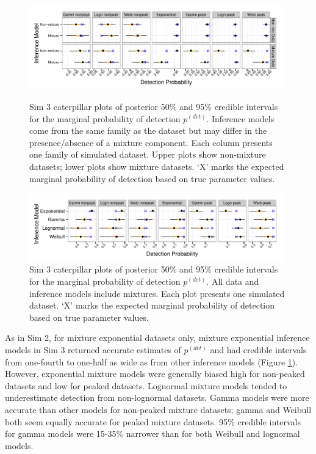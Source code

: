 \documentclass[useAMS,usenatbib,referee,12pt]{article}
\begin{document}
\begin{figure}[h!]\centering
\includegraphics[width=0.98\textwidth]{Sims/SimFull/pdet_cater_correct.pdf}
\caption{\label{pdet_cater_correct} Sim 3 caterpillar plots of posterior 50\% and 95\% credible intervals for the marginal probability of detection $p^{(det)}$.  
Inference models come from the same family as the dataset but may differ in the presence/absence of a mixture component.  
Each column presents one family of simulated dataset.  
Upper plots show non-mixture datasets; lower plots show mixture datasets.  
`X' marks the expected marginal probability of detection based on true parameter values.}
\includegraphics[width=0.98\textwidth]{Sims/SimFull/pdet_cater_family.pdf}
\caption{\label{pdet_cater_family}  Sim 3 caterpillar plots of posterior 50\% and 95\% credible intervals for the marginal probability of detection $p^{(det)}$. All data and inference models include mixtures.  
Each plot presents one simulated dataset.  
`X' marks the expected marginal probability of detection based on true parameter values.}
\end{figure}

As in Sim 2, for mixture exponential datasets only, mixture exponential inference models in Sim 3 returned accurate estimates of $p^{(det)}$ and had credible intervals from one-fourth to one-half as wide as from other inference models (Figure \ref{pdet_cater_family}).  
However, exponential mixture models were generally biased high for non-peaked datasets and low for peaked datasets.  
Lognormal mixture models tended to underestimate detection from non-lognormal datasets.  
Gamma models were more accurate than other models for non-peaked mixture datasets; gamma and Weibull both seem equally accurate for peaked mixture datasets.  
95\% credible intervals for gamma models were 15-35\% narrower than for both Weibull and lognormal models.
\end{document}
